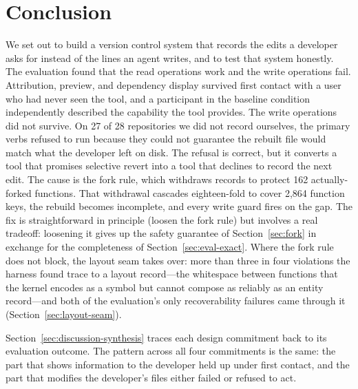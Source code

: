 \section{Conclusion}

We set out to build a version control system that records the edits a developer
asks for instead of the lines an agent writes, and to test that system honestly.
The evaluation found that the read operations work and the write operations fail.
Attribution, preview, and dependency display survived first contact with a user
who had never seen the tool, and a participant in the baseline condition
independently described the capability the tool provides. The write operations
did not survive. On 27 of 28 repositories we did not record ourselves, the
primary verbs refused to run because they could not guarantee the rebuilt file
would match what the developer left on disk. The refusal is correct, but it
converts a tool that promises selective revert into a tool that declines to
record the next edit. The cause is the fork rule, which withdraws records to protect 162
actually-forked functions. That withdrawal cascades
eighteen-fold to cover 2{,}864 function keys, the rebuild becomes incomplete, and
every write guard fires on the gap. The fix is straightforward in principle
(loosen the fork rule) but involves a real tradeoff: loosening it gives up the
safety guarantee of Section~\ref{sec:fork} in exchange for the completeness of
Section~\ref{sec:eval-exact}. Where the fork rule does not block, the layout
seam takes over: more than three in four violations the harness found trace to
a layout record---the whitespace between functions that the kernel encodes as a
symbol but cannot compose as reliably as an entity record---and both of the
evaluation's only recoverability failures came through it
(Section~\ref{sec:layout-seam}).

Section~\ref{sec:discussion-synthesis} traces each design commitment back to its
evaluation outcome. The pattern across all four commitments is the same: the part
that shows information to the developer held up under first contact, and the part
that modifies the developer's files either failed or refused to act.

